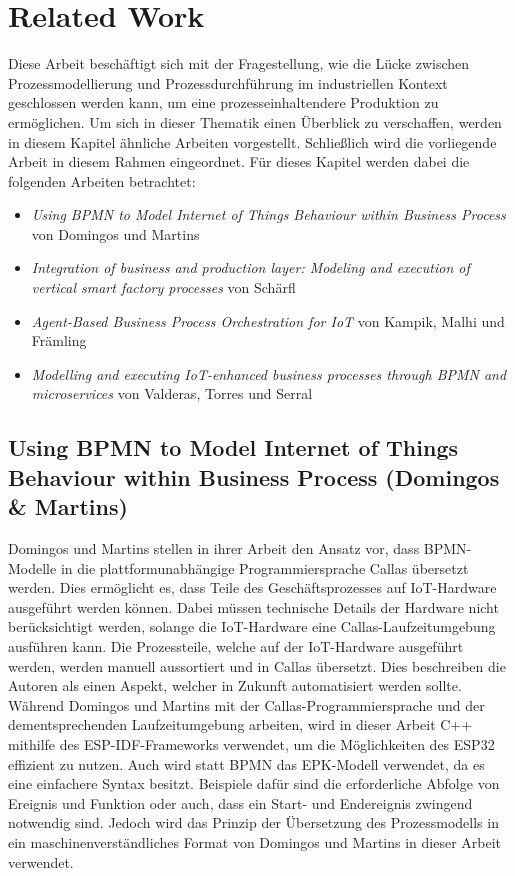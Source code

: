 \chapter{Related Work}
\label{related-work}

Diese Arbeit beschäftigt sich mit der Fragestellung, wie die Lücke zwischen Prozessmodellierung und Prozessdurchführung im industriellen Kontext geschlossen werden kann, um eine 
prozesseinhaltendere Produktion zu ermöglichen.
Um sich in dieser Thematik einen Überblick zu verschaffen, werden in diesem Kapitel ähnliche Arbeiten vorgestellt. 
Schließlich wird die vorliegende Arbeit in diesem Rahmen eingeordnet. Für dieses Kapitel werden dabei die folgenden Arbeiten betrachtet:

\begin{itemize}
\item \textit{Using BPMN to Model Internet of Things Behaviour within Business Process} von Domingos und Martins \cite{domingos_using_2022}

\item \textit{Integration of business and production layer: Modeling and execution of vertical smart factory processes} von Schärfl \cite{schaerfl_integration_2016}

\item \textit{Agent-Based Business Process Orchestration for IoT} von Kampik, Malhi und Främling \cite{kampik_agent-based_2019}

\item \textit{Modelling and executing IoT-enhanced business processes through BPMN and microservices} von Valderas, Torres und Serral \cite{valderas_modelling_2022}
\end{itemize}

\section{Using BPMN to Model Internet of Things Behaviour within Business Process (Domingos \& Martins)}

\noindent Domingos und Martins stellen in ihrer Arbeit den Ansatz vor, dass BPMN-Modelle in die plattformunabhängige Programmiersprache Callas übersetzt werden. Dies ermöglicht es, dass Teile des Geschäftsprozesses auf IoT-Hardware ausgeführt werden können. Dabei müssen technische Details der Hardware nicht berücksichtigt werden, solange die IoT-Hardware eine Callas-Laufzeitumgebung ausführen kann. Die Prozessteile, welche auf der IoT-Hardware ausgeführt werden, werden manuell aussortiert und in Callas übersetzt. Dies beschreiben die Autoren als einen Aspekt, welcher in Zukunft automatisiert werden sollte. \cite{domingos_using_2022} Während Domingos und Martins mit der Callas-Programmiersprache und der dementsprechenden Laufzeitumgebung arbeiten, wird in dieser Arbeit C++ mithilfe des ESP-IDF-Frameworks verwendet, um die Möglichkeiten des ESP32 effizient zu nutzen. Auch wird statt BPMN das EPK-Modell verwendet, da es eine einfachere Syntax besitzt. Beispiele dafür sind die erforderliche Abfolge von Ereignis und Funktion oder auch, dass ein Start- und Endereignis zwingend notwendig sind. Jedoch wird das Prinzip der Übersetzung des Prozessmodells in ein maschinenverständliches Format von Domingos und Martins in dieser Arbeit verwendet.


